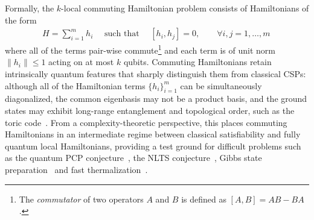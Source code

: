 \documentclass[11pt]{article}
\theoremstyle{plain}
\begin{document}
\noindent Formally, the $k$-local commuting Hamiltonian problem consists of Hamiltonians of the form
\begin{align}
H=\sum_{i=1}^m h_i \quad \text{ such that } \quad [h_i,h_j]=0, \quad\quad  \forall i,j=1,\dots,m \,
\end{align}
where all of the terms pair-wise commute\footnote{The \emph{commutator} of two operators $A$ and $B$ is defined as $[A,B] = AB - BA$.} and each term is of unit norm $\|h_i\|\leq 1$ acting on at most $k$ qubits.
Commuting Hamiltonians retain intrinsically quantum features that sharply distinguish them from classical CSPs: although all of the Hamiltonian terms $\{h_i\}_{i=1}^m$ can be simultaneously diagonalized, the common eigenbasis may not be a product basis, and the ground states may exhibit long-range entanglement and topological order, such as the toric code~\cite{Kitaev_2003}. From a complexity-theoretic perspective, this places commuting Hamiltonians in an intermediate regime between classical satisfiability and fully quantum local Hamiltonians, providing a test ground for difficult problems such as the quantum PCP conjecture~\cite{aharonov2011complexity,Hastings2012}, the NLTS conjecture~\cite{Anshu_2023}, Gibbs state preparation~\cite{kastoryano2016quantumgibbssamplerscommuting} and fast thermalization~\cite{chen2023fastthermalizationeigenstatethermalization}.
\end{document}
